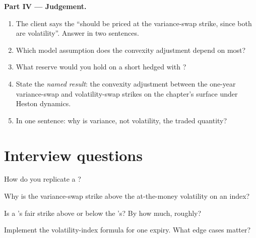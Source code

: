 \begin{problem}
\medskip\noindent\textbf{Part IV --- Judgement.}
\begin{enumerate}[resume]
\item The client says the  ``should be priced at the variance-swap strike, since both are
volatility''. Answer in two sentences.
\item Which model assumption does the convexity adjustment depend on most?
\item What reserve would you hold on a short  hedged with ?
\item State the \emph{named result}: the convexity adjustment between the one-year variance-swap and
volatility-swap strikes on the chapter's surface under Heston dynamics.
\item In one sentence: why is variance, not volatility, the traded quantity?
\end{enumerate}
\end{problem}

\section{Interview questions}

\begin{interviewq}\label{iq:dv:variance-swaps-and-volatility-derivatives:1}
How do you replicate a ?
\end{interviewq}

\begin{interviewq}\label{iq:dv:variance-swaps-and-volatility-derivatives:2}
Why is the variance-swap strike above the at-the-money volatility on an index?
\end{interviewq}

\begin{interviewq}\label{iq:dv:variance-swaps-and-volatility-derivatives:3}
Is a 's fair strike above or below the 's? By how much, roughly?
\end{interviewq}

\begin{interviewq}\label{iq:dv:variance-swaps-and-volatility-derivatives:4}
Implement the volatility-index formula for one expiry. What edge cases matter?
\end{interviewq}


